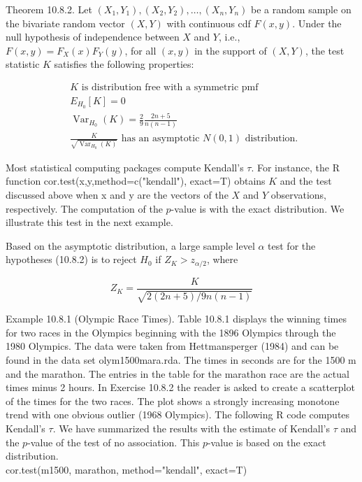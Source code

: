 Theorem 10.8.2. Let $\left(X_{1}, Y_{1}\right),\left(X_{2}, Y_{2}\right), \ldots,\left(X_{n}, Y_{n}\right)$ be a random sample on the bivariate random vector $(X, Y)$ with continuous cdf $F(x, y)$. Under the null hypothesis of independence between $X$ and $Y$, i.e., $F(x, y)=F_{X}(x) F_{Y}(y)$, for all $(x, y)$ in the support of $(X, Y)$, the test statistic $K$ satisfies the following properties:


\begin{align*}
& K \text { is distribution free with a symmetric pmf }  \tag{10.8.4}\\
& E_{H_{0}}[K]=0  \tag{10.8.5}\\
& \operatorname{Var}_{H_{0}}(K)=\frac{2}{9} \frac{2 n+5}{n(n-1)}  \tag{10.8.6}\\
& \frac{K}{\sqrt{\operatorname{Var}_{H_{0}}(K)}} \text { has an asymptotic } N(0,1) \text { distribution. } \tag{10.8.7}
\end{align*}


Most statistical computing packages compute Kendall's $\tau$. For instance, the R function cor.test(x,y,method=c("kendall"), exact=T) obtains $K$ and the test discussed above when x and y are the vectors of the $X$ and $Y$ observations, respectively. The computation of the $p$-value is with the exact distribution. We illustrate this test in the next example.

Based on the asymptotic distribution, a large sample level $\alpha$ test for the hypotheses (10.8.2) is to reject $H_{0}$ if $Z_{K}>z_{\alpha / 2}$, where


\begin{equation*}
Z_{K}=\frac{K}{\sqrt{2(2 n+5) / 9 n(n-1)}} \tag{10.8.8}
\end{equation*}


Example 10.8.1 (Olympic Race Times). Table 10.8.1 displays the winning times for two races in the Olympics beginning with the 1896 Olympics through the 1980 Olympics. The data were taken from Hettmansperger (1984) and can be found in the data set olym1500mara.rda. The times in seconds are for the 1500 m and the marathon. The entries in the table for the marathon race are the actual times minus 2 hours. In Exercise 10.8.2 the reader is asked to create a scatterplot of the times for the two races. The plot shows a strongly increasing monotone trend with one obvious outlier (1968 Olympics). The following R code computes Kendall's $\tau$. We have summarized the results with the estimate of Kendall's $\tau$ and the $p$-value of the test of no association. This $p$-value is based on the exact distribution.\\
cor.test(m1500, marathon, method="kendall", exact=T)

